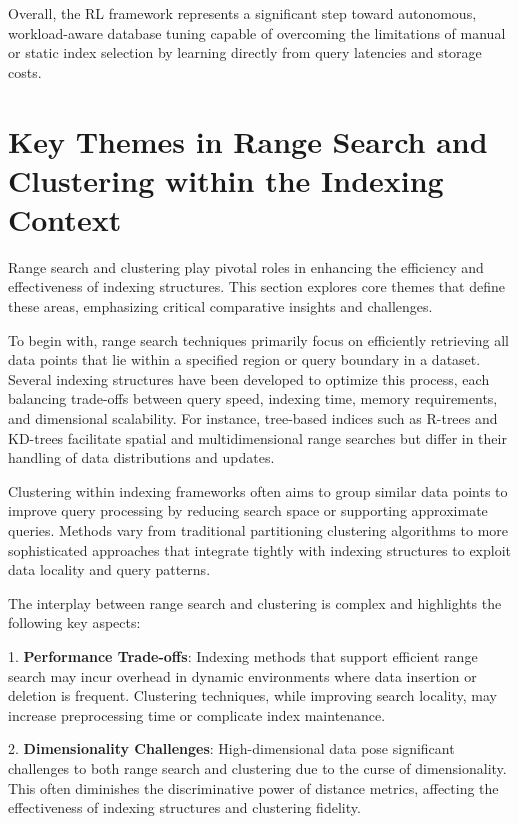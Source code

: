 \documentclass[sigconf]{acmart}
\begin{document}
Overall, the RL framework represents a significant step toward autonomous, workload-aware database tuning capable of overcoming the limitations of manual or static index selection by learning directly from query latencies and storage costs.

\section{Key Themes in Range Search and Clustering within the Indexing Context}

Range search and clustering play pivotal roles in enhancing the efficiency and effectiveness of indexing structures. This section explores core themes that define these areas, emphasizing critical comparative insights and challenges.

To begin with, range search techniques primarily focus on efficiently retrieving all data points that lie within a specified region or query boundary in a dataset. Several indexing structures have been developed to optimize this process, each balancing trade-offs between query speed, indexing time, memory requirements, and dimensional scalability. For instance, tree-based indices such as R-trees and KD-trees facilitate spatial and multidimensional range searches but differ in their handling of data distributions and updates.

Clustering within indexing frameworks often aims to group similar data points to improve query processing by reducing search space or supporting approximate queries. Methods vary from traditional partitioning clustering algorithms to more sophisticated approaches that integrate tightly with indexing structures to exploit data locality and query patterns.

The interplay between range search and clustering is complex and highlights the following key aspects:

1. \textbf{Performance Trade-offs}: Indexing methods that support efficient range search may incur overhead in dynamic environments where data insertion or deletion is frequent. Clustering techniques, while improving search locality, may increase preprocessing time or complicate index maintenance.

2. \textbf{Dimensionality Challenges}: High-dimensional data pose significant challenges to both range search and clustering due to the curse of dimensionality. This often diminishes the discriminative power of distance metrics, affecting the effectiveness of indexing structures and clustering fidelity.
\end{document}
